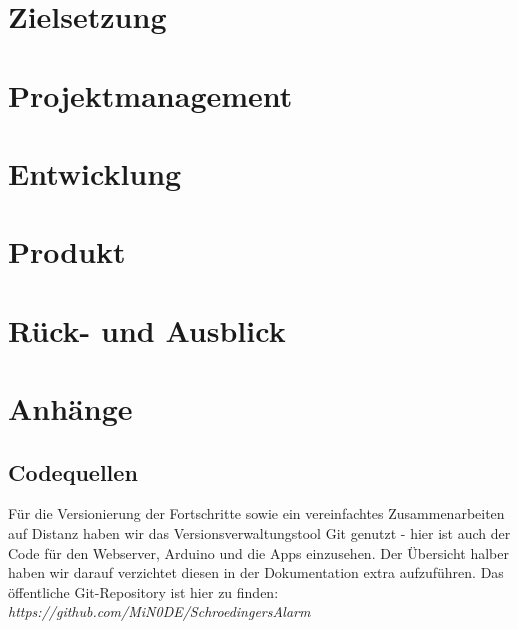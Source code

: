 \documentclass[11pt,a4paper,ngerman]{report}
\begin{document}
	
	
	\chapter{Zielsetzung}
	
	
	\chapter{Projektmanagement}
		
		
	\chapter{Entwicklung}
	
		
			
		
    \chapter{Produkt}
	
	\chapter{Rück- und Ausblick}
	
	
	\chapter{Anhänge}
	\section{Codequellen}
	Für die Versionierung der Fortschritte sowie ein vereinfachtes Zusammenarbeiten auf Distanz haben wir das Versionsverwaltungstool Git genutzt - hier ist auch der Code für den Webserver, Arduino und die Apps einzusehen. Der Übersicht halber haben wir darauf verzichtet diesen in der Dokumentation extra aufzuführen. Das öffentliche Git-Repository ist hier zu finden: \textit{https://github.com/MiN0DE/SchroedingersAlarm}
	
	
	\listoffigures
	\printbibliography[heading=bibintoc, title={Quellenverzeichnis}]
\end{document}
